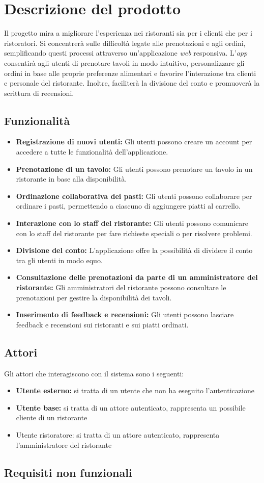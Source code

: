 \section{Descrizione del prodotto}
Il progetto mira a migliorare l'esperienza nei ristoranti sia per i clienti che per i ristoratori.
Si concentrerà sulle difficoltà legate alle prenotazioni e agli ordini, semplificando questi processi attraverso un'applicazione \textit{web} responsiva.
L'\textit{app} consentirà agli utenti di prenotare tavoli in modo intuitivo, personalizzare gli ordini in base alle proprie preferenze alimentari e favorire l'interazione tra clienti e personale del ristorante.
Inoltre, faciliterà la divisione del conto e promuoverà la scrittura di recensioni.

\subsection{Funzionalità}

\begin{itemize}
	\item \textbf{Registrazione di nuovi utenti:} Gli utenti possono creare un account per accedere a tutte le funzionalità dell'applicazione.
	\item \textbf{Prenotazione di un tavolo:} Gli utenti possono prenotare un tavolo in un ristorante in base alla disponibilità.
	\item \textbf{Ordinazione collaborativa dei pasti:} Gli utenti possono collaborare per ordinare i pasti, permettendo a ciascuno di aggiungere piatti al carrello.
	\item \textbf{Interazione con lo staff del ristorante:} Gli utenti possono comunicare con lo staff del ristorante per fare richieste speciali o per risolvere problemi.
	\item \textbf{Divisione del conto:} L'applicazione offre la possibilità di dividere il conto tra gli utenti in modo equo.
	\item \textbf{Consultazione delle prenotazioni da parte di un amministratore del ristorante:} Gli amministratori del ristorante possono consultare le prenotazioni per gestire la disponibilità dei tavoli.
	\item \textbf{Inserimento di feedback e recensioni:} Gli utenti possono lasciare feedback e recensioni sui ristoranti e sui piatti ordinati.
\end{itemize}

\subsection{Attori}
Gli attori che interagiscono con il sistema sono i seguenti:
\begin{itemize}
	\item \textbf{Utente esterno:} si tratta di un utente che non ha eseguito l'autenticazione
	\item \textbf{Utente base:} si tratta di un attore autenticato, rappresenta un possibile cliente di un ristorante
	\item {Utente ristoratore:} si tratta di un attore autenticato, rappresenta l'amministratore del ristorante
\end{itemize}

\subsection{Requisiti non funzionali}
